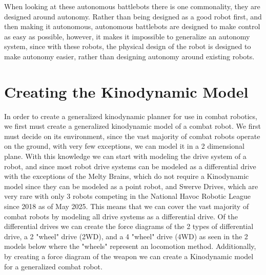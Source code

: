 \documentclass[conference]{IEEEtran}
\begin{document}
When looking at these autonomous battlebots there is one commonality, they are designed around autonomy.  Rather than being designed as a good robot first, and then making it autonomous, autonomous battlebots are designed to make control as easy as possible, however, it makes it impossible to generalize an autonomy system, since with these robots, the physical design of the robot is designed to make autonomy easier, rather than designing autonomy around existing robots.

\section{Creating the Kinodynamic Model}
In order to create a generalized kinodynamic planner for use in combat robotics, we first must create a generalized kinodynamic model of a combat robot.  We first must decide on its environment, since the vast majority of combat robots operate on the ground, with very few exceptions, we can model it in a 2 dimensional plane.  With this knowledge we can start with modeling the drive system of a robot, and since most robot drive systems can be modeled as a differential drive with the exceptions of the Melty Brains, which do not require a Kinodynamic model since they can be modeled as a point robot, and Swerve Drives, which are very rare with only 3 robots competing in the National Havoc Robotic League since 2018 as of May 2025\cite{b2}.  This means that we can cover the vast majority of combat robots by modeling all drive systems as a differential drive.  Of the differential drives we can create the force diagrams of the 2 types of differential drive, a 2 "wheel" drive (2WD), and a 4 "wheel" drive (4WD) as seen in the 2 models below where the "wheels" represent an locomotion method.  Additionally, by creating a force diagram of the weapon we can create a Kinodynamic model for a generalized combat robot.
\end{document}
